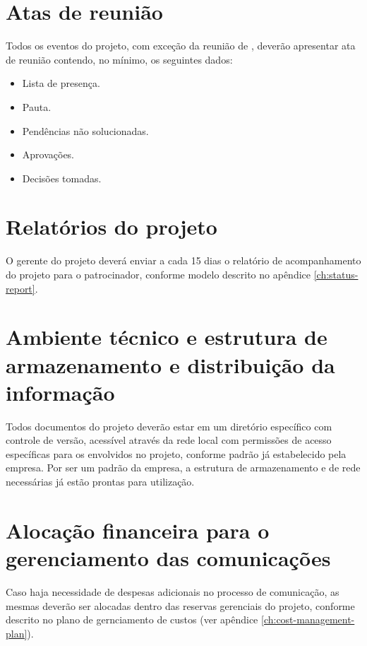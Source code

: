 
\section{Atas de reunião}

Todos os eventos do projeto, com exceção da reunião de , deverão apresentar ata de reunião contendo, no mínimo, os seguintes dados:

\begin{itemize}
	\item Lista de presença.
	\item Pauta.
	\item Pendências não solucionadas.
	\item Aprovações.
	\item Decisões tomadas.
\end{itemize}


\section{Relatórios do projeto}

O gerente do projeto deverá enviar a cada 15 dias o relatório de acompanhamento do projeto para o patrocinador, conforme modelo descrito no apêndice \ref{ch:status-report}.

\section{Ambiente técnico e estrutura de armazenamento e distribuição da informação}

Todos documentos do projeto deverão estar em um diretório específico com controle de versão, acessível através da rede local com permissões de acesso específicas para os envolvidos no projeto, conforme padrão já estabelecido pela empresa. Por ser um padrão da empresa, a estrutura de armazenamento e de rede necessárias já estão prontas para utilização.

\section{Alocação financeira para o gerenciamento das comunicações}

Caso haja necessidade de despesas adicionais no processo de comunicação, as mesmas deverão ser alocadas dentro das reservas gerenciais do projeto, conforme descrito no plano de gernciamento de custos (ver apêndice \ref{ch:cost-management-plan}).

